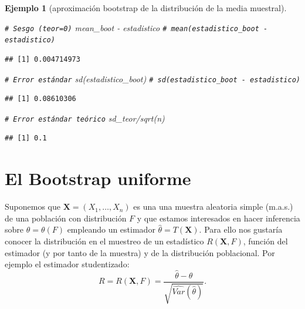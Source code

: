 \documentclass[
]{book}
\newenvironment{Shaded}{\begin{snugshade}}{\end{snugshade}}
\newcommand{\CommentTok}[1]{\textcolor[rgb]{0.56,0.35,0.01}{\textit{#1}}}
\newcommand{\FunctionTok}[1]{\textcolor[rgb]{0.00,0.00,0.00}{#1}}
\newcommand{\NormalTok}[1]{#1}
\newcommand{\SpecialCharTok}[1]{\textcolor[rgb]{0.00,0.00,0.00}{#1}}
\theoremstyle{break}
\newtheorem{example}{Ejemplo}[chapter]
\theoremstyle{nonumberplain}
\renewcommand{\CommentTok}[1]{\textcolor[rgb]{0.41,0.41,0.41}{\texttt{#1}}}
\begin{document}
\begin{example}[aproximación bootstrap de la distribución de la media muestral]
\begin{Shaded}
\begin{Highlighting}[]
\CommentTok{\# Sesgo (teor=0)}
\NormalTok{mean\_boot }\SpecialCharTok{{-}}\NormalTok{ estadistico }\CommentTok{\# mean(estadistico\_boot {-} estadistico)}
\end{Highlighting}
\end{Shaded}

\begin{verbatim}
## [1] 0.004714973
\end{verbatim}

\begin{Shaded}
\begin{Highlighting}[]
\CommentTok{\# Error estándar}
\FunctionTok{sd}\NormalTok{(estadistico\_boot) }\CommentTok{\# sd(estadistico\_boot {-} estadistico)}
\end{Highlighting}
\end{Shaded}

\begin{verbatim}
## [1] 0.08610306
\end{verbatim}

\begin{Shaded}
\begin{Highlighting}[]
\CommentTok{\# Error estándar teórico}
\NormalTok{sd\_teor}\SpecialCharTok{/}\FunctionTok{sqrt}\NormalTok{(n) }
\end{Highlighting}
\end{Shaded}

\begin{verbatim}
## [1] 0.1
\end{verbatim}

\end{example}

\hypertarget{boot-unif}{%
\section{El Bootstrap uniforme}\label{boot-unif}}

Suponemos que \(\mathbf{X}=\left( X_1,\ldots ,X_n \right)\) es una una muestra aleatoria simple (m.a.s.)
de una población con distribución \(F\) y que estamos interesados en hacer inferencia sobre \(\theta =\theta \left(F \right)\) empleando un estimador \(\hat{\theta} = T\left( \mathbf{X} \right)\).
Para ello nos gustaría conocer la distribución en el muestreo de un estadístico \(R\left( \mathbf{X},F \right)\), función del estimador (y por tanto de la muestra) y de la distribución poblacional.
Por ejemplo el estimador studentizado:
\[R=R\left( \mathbf{X},F \right) = \frac{\hat \theta - \theta}{\sqrt{\widehat{Var}(\hat \theta)}}.\]
\end{document}
